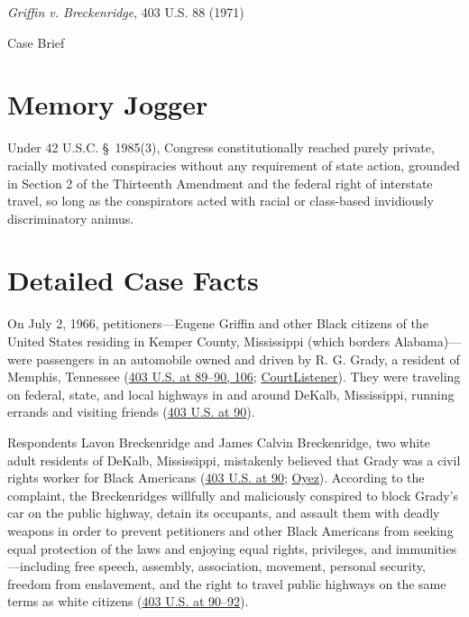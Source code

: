 \documentclass[12pt]{article}
\begin{document}
\begin{center}
{\LARGE \textit{Griffin v. Breckenridge}, 403 U.S. 88 (1971)\par}
\vspace{0.8em}
{\large Case Brief\par}
\end{center}
\vspace{1em}

\section{Memory Jogger}

Under 42 U.S.C. \S~1985(3), Congress constitutionally reached purely private, racially motivated conspiracies without any requirement of state action, grounded in Section 2 of the Thirteenth Amendment and the federal right of interstate travel, so long as the conspirators acted with racial or class-based invidiously discriminatory animus.

\section{Detailed Case Facts}

On July 2, 1966, petitioners---Eugene Griffin and other Black citizens of the United States residing in Kemper County, Mississippi (which borders Alabama)---were passengers in an automobile owned and driven by R. G. Grady, a resident of Memphis, Tennessee (\href{https://supreme.justia.com/cases/federal/us/403/88/}{403 U.S. at 89--90, 106}; \href{https://www.courtlistener.com/opinion/108362/griffin-v-breckenridge/}{CourtListener}). They were traveling on federal, state, and local highways in and around DeKalb, Mississippi, running errands and visiting friends (\href{https://supreme.justia.com/cases/federal/us/403/88/}{403 U.S. at 90}).

Respondents Lavon Breckenridge and James Calvin Breckenridge, two white adult residents of DeKalb, Mississippi, mistakenly believed that Grady was a civil rights worker for Black Americans (\href{https://supreme.justia.com/cases/federal/us/403/88/}{403 U.S. at 90}; \href{https://www.oyez.org/cases/1970/144}{Oyez}). According to the complaint, the Breckenridges willfully and maliciously conspired to block Grady's car on the public highway, detain its occupants, and assault them with deadly weapons in order to prevent petitioners and other Black Americans from seeking equal protection of the laws and enjoying equal rights, privileges, and immunities---including free speech, assembly, association, movement, personal security, freedom from enslavement, and the right to travel public highways on the same terms as white citizens (\href{https://supreme.justia.com/cases/federal/us/403/88/}{403 U.S. at 90--92}).
\end{document}

